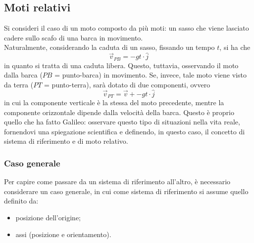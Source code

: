 \documentclass[a4paper]{extarticle}
\begin{document}
\subsection{Moti relativi}
Si consideri il caso di un moto composto da più moti: un sasso che viene lasciato cadere sullo scafo di una barca in movimento.\\
Naturalmente, considerando la caduta di un sasso, fissando un tempo $t$, si ha che
\[\vec{v}_{PB} = -g t \cdot \hat{j}\]
in quanto si tratta di una caduta libera. Questo, tuttavia, osservando il moto dalla barca ($PB$ = punto-barca) in movimento. Se, invece, tale moto viene visto da terra ($PT$ = punto-terra), sarà dotato di due componenti, ovvero
\[\vec{v}_{PT} = \vec{v} + -g t \cdot \hat{j}\]
in cui la componente verticale è la stessa del moto precedente, mentre la componente orizzontale dipende dalla velocità della barca. Questo è proprio quello che ha fatto Galileo: osservare questo tipo di situazioni nella vita reale, fornendovi una spiegazione scientifica e definendo, in questo caso, il concetto di sistema di riferimento e di moto relativo.

\subsubsection{Caso generale}
Per capire come passare da un sistema di riferimento all'altro, è necessario considerare un caso generale, in cui come sistema di riferimento si assume quello definito da:
\begin{itemize}
  \item posizione dell'origine;
  \item assi (posizione e orientamento).
\end{itemize}
\end{document}
